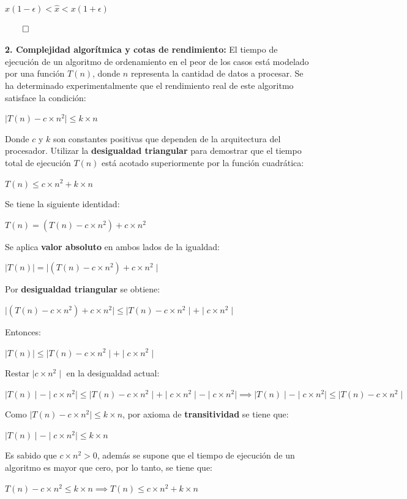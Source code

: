 \documentclass{article}
\begin{document}
$x(1 - \epsilon) < \hat{x} < x(1 + \epsilon)$

$\qed$

\textbf{2. Complejidad algorítmica y cotas de rendimiento:} El tiempo de ejecución de un algoritmo de ordenamiento en el peor de los casos está modelado por una función $T(n)$, donde $n$ representa la cantidad de datos a procesar. Se ha determinado experimentalmente que el rendimiento real de este algoritmo satisface la condición:

$\mid T(n) - c \times n^2 \mid \le k \times n$

Donde $c$ y $k$ son constantes positivas que dependen de la arquitectura del procesador. Utilizar la \textbf{desigualdad triangular} para demostrar que el tiempo total de ejecución $T(n)$ está acotado superiormente por la función cuadrática:

$T(n) \le c \times n^2 + k \times n$

Se tiene la siguiente identidad:

$T(n)  = (T(n) - c \times n^2) + c \times n^2$

Se aplica \textbf{valor absoluto} en ambos lados de la igualdad:

$\mid T(n) \mid  = \mid (T(n) - c \times n^2) + c \times n^2 \mid$

Por \textbf{desigualdad triangular} se obtiene:

$\mid (T(n) - c \times n^2) + c \times n^2 \mid \le \mid T(n) - c \times n^2 \mid + \mid c \times n^2 \mid$

Entonces:

$\mid T(n) \mid \le \mid T(n) - c \times n^2 \mid + \mid c \times n^2 \mid$

Restar $\mid c \times n^2 \mid$ en la desigualdad actual:

$\mid T(n) \mid - \mid c \times n^2 \mid \le \mid T(n) - c \times n^2 \mid + \mid c \times n^2 \mid - \mid c \times n^2 \mid \implies \mid T(n) \mid - \mid c \times n^2 \mid  \le \mid T(n) - c \times n^2 \mid$

Como $\mid T(n) - c \times n^2 \mid \le k \times n$, por axioma de \textbf{transitividad} se tiene que:

$\mid T(n) \mid - \mid c \times n^2 \mid \le k \times n$

Es sabido que $c \times n^2 > 0$, además se supone que el tiempo de ejecución de un algoritmo es mayor que cero, por lo tanto, se tiene que:

$T(n) - c \times n^2 \le k \times n \implies T(n) \le c \times n^2 + k \times n$
\end{document}

